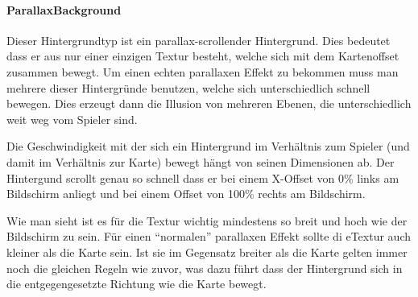 \paragraph{ParallaxBackground}

Dieser Hintergrundtyp ist ein parallax-scrollender Hintergrund. Dies bedeutet dass er aus nur einer einzigen Textur besteht, welche sich mit dem Kartenoffset zusammen bewegt. Um einen echten parallaxen Effekt zu bekommen muss man mehrere dieser Hintergründe benutzen, welche sich unterschiedlich schnell bewegen. Dies erzeugt dann die Illusion von mehreren Ebenen, die unterschiedlich weit weg vom Spieler sind.

Die Geschwindigkeit mit der sich ein Hintergrund im Verhältnis zum Spieler (und damit im Verhältnis zur Karte) bewegt hängt von seinen Dimensionen ab. Der Hintergund scrollt genau so schnell dass er bei einem X-Offset von 0\% links am Bildschirm anliegt und bei einem Offset von 100\% rechts am Bildschirm.


Wie man sieht ist es für die Textur wichtig mindestens so breit und hoch wie der Bildschirm zu sein. Für einen ``normalen'' parallaxen Effekt sollte di eTextur auch kleiner als die Karte sein. Ist sie im Gegensatz breiter  als die Karte gelten immer noch die gleichen Regeln wie zuvor, was dazu führt dass der Hintergrund sich in die entgegengesetzte Richtung wie die Karte bewegt.

